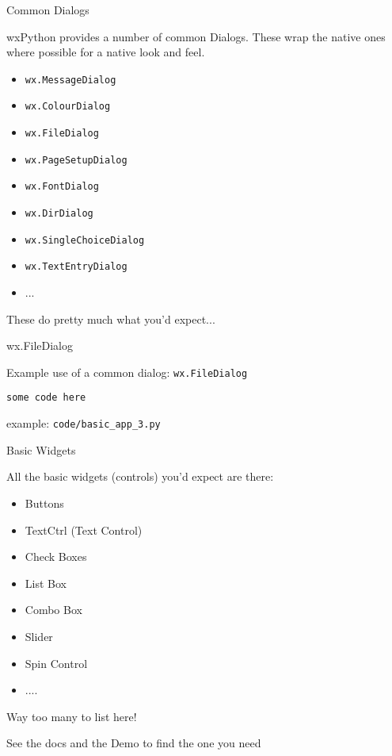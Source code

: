\documentclass{beamer}
\begin{document}
\begin{frame}[fragile]{Common Dialogs}

\vfill
{\Large wxPython provides a number of common Dialogs. These wrap the native ones where possible for a native look and feel.}

\begin{itemize}
 \item \verb`wx.MessageDialog`
 \item \verb`wx.ColourDialog`
 \item \verb`wx.FileDialog`
 \item \verb`wx.PageSetupDialog`
 \item \verb`wx.FontDialog`
 \item \verb`wx.DirDialog`
 \item \verb`wx.SingleChoiceDialog`
 \item \verb`wx.TextEntryDialog`
 \item ...
\end{itemize}

\vfill
{\Large These do pretty much what you'd expect...}

\end{frame}

\begin{frame}[fragile]{wx.FileDialog}

\vfill
{\Large Example use of a common dialog: \verb`wx.FileDialog`}\\

\begin{verbatim}
some code here
\end{verbatim}

\vfill
example: \verb`code/basic_app_3.py`
\end{frame}

\begin{frame}[fragile]{Basic Widgets}

\vfill
{\Large All the basic widgets (controls) you'd expect are there:}

\begin{itemize}
 \item Buttons
 \item TextCtrl (Text Control)
 \item Check Boxes
 \item List Box
 \item Combo Box
 \item Slider
 \item Spin Control
 \item ....
\end{itemize}

\vfill
{\Large Way too many to list here!}

\vfill
{\Large See the docs and the Demo to find the one you need}

\end{frame}
\end{document}
